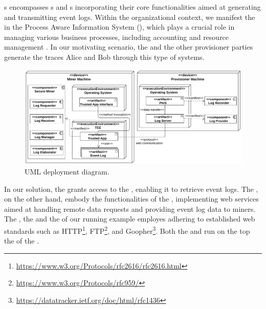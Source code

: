 s encompasses s and s incorporating their core functionalities aimed at generating and transmitting event logs. Within the organizational context, we manifest the  in the Process Aware Information System (), which plays a crucial role in managing various business processes, including accounting and resource management \cite{Dumas.etal/2018:FundamentalsofBPM}. In our motivating scenario, the  and the other provisioner parties generate the traces Alice and Bob through this type of systems.
\begin{figure}[t]
	\centering
	\includegraphics[width=1\linewidth]{content/figures/deploymentdiagram3.pdf}
	\caption{UML deployment diagram.}
	\label{fig:deployment_diagram}
\end{figure}
In our solution, the  grants access to the , enabling it to retrieve event logs. The , on the other hand, embody the functionalities of the , implementing web services aimed at handling remote data requests and providing event log data to miners. The , the  and the  of our running example employes  adhering to established web standards such as HTTP\footnote{\url{https://www.w3.org/Protocols/rfc2616/rfc2616.html}}, FTP\footnote{\url{https://www.w3.org/Protocols/rfc959/}}, and Goopher\footnote{\url{https://datatracker.ietf.org/doc/html/rfc1436}}. Both the  and  run on the top the  of the .

